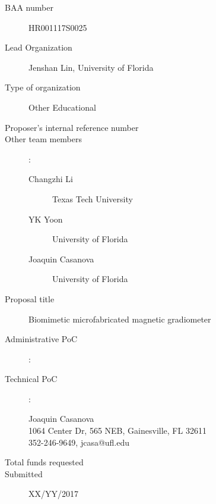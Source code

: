 
\begin{description}
\item [BAA number] HR001117S0025
\item [Lead Organization] Jenshan Lin, University of Florida
\item [Type of organization] Other Educational
\item [Proposer’s internal reference number]
\item [Other team members]:
  \begin{description}
  \item [Changzhi Li] Texas Tech University
  \item [YK Yoon] University of Florida 
  \item [Joaquin Casanova] University of Florida 
  \end{description}
\item [Proposal title] Biomimetic microfabricated magnetic gradiometer
\item [Administrative PoC]:
  \begin{description}
  \item []
  \item []
  \item []
  \end{description}
\item [Technical PoC]:
  \begin{description}
  \item [Joaquin Casanova]
  \item [1064 Center Dr, 565 NEB, Gainesville, FL 32611]
  \item [352-246-9649, jcasa@ufl.edu]
  \end{description}
\item [Total funds requested]
\item [Submitted] XX/YY/2017
\end{description}
